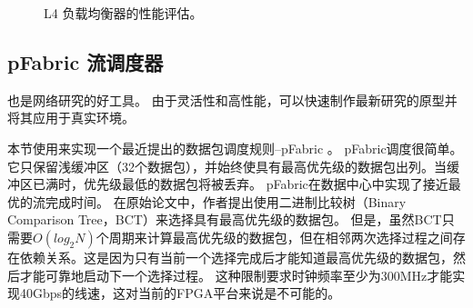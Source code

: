 \begin{figure}[htbp]
	\centering
	
	
	
	\caption{L4 负载均衡器的性能评估。}
	\label{clicknp:fig:l4}
	
\end{figure}


\subsection{pFabric 流调度器}


\name 也是网络研究的好工具。
由于灵活性和高性能，\name 可以快速制作最新研究的原型并将其应用于真实环境。

本节使用\name 来实现一个最近提出的数据包调度规则--pFabric \cite {pfabric}。
pFabric调度很简单。它只保留浅缓冲区（32个数据包），并始终使具有最高优先级的数据包出列。当缓冲区已满时，优先级最低的数据包将被丢弃。
pFabric在数据中心中实现了接近最优的流完成时间。
在原始论文中，作者提出使用二进制比较树（Binary Comparison Tree，BCT）来选择具有最高优先级的数据包。
但是，虽然BCT只需要$O(log_2 N)$个周期来计算最高优先级的数据包，但在相邻两次选择过程之间存在依赖关系。这是因为只有当前一个选择完成后才能知道最高优先级的数据包，然后才能可靠地启动下一个选择过程。
这种限制要求时钟频率至少为300MHz才能实现40Gbps的线速，这对当前的FPGA平台来说是不可能的。




